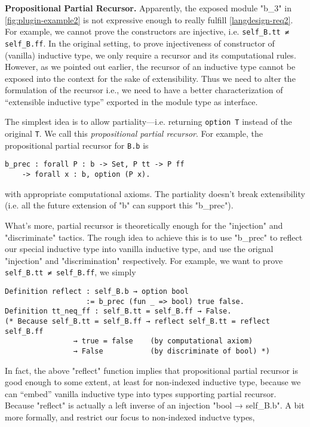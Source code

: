 \textbf{Propositional Partial Recursor.}
Apparently, the exposed module "b_3" in \cref{fig:plugin-example2} is not expressive enough to really fulfill \ref{langdesign-req2}. For example, we cannot prove the constructors are injective, i.e. \texttt{self_B.tt ≠ self_B.ff}. In the original setting, to prove injectiveness of constructor of (vanilla) inductive type, we only require a recursor and its computational rules. However, as we pointed out earlier, the recursor of an inductive type cannot be exposed into the context for the sake of extensibility. Thus we need to alter the formulation of the recursor i.e., we need to have a better characterization of ``extensible inductive type'' exported in the module type as interface.


The simplest idea is to allow partiality---i.e. returning \texttt{option T} instead of the original \texttt{T}. We call this \textit{propositional partial recursor}. For example, the propositional partial recursor for \texttt{B.b} is 
\begin{verbatim}
b_prec : forall P : b -> Set, P tt -> P ff 
    -> forall x : b, option (P x). 
\end{verbatim}
with appropriate computational axioms. The partiality doesn't break extensibility (i.e. all the future extension of "b" can support this "b_prec"). 

What's more, partial recursor is theoretically enough for the "injection" and "discriminate" tactics. The rough idea to achieve this is to use "b_prec" to reflect our special inductive type into vanilla inductive type, and use the orignal "injection" and "discrimination" respectively. For example, we want to prove \texttt{self_B.tt ≠ self_B.ff}, we simply 
\begin{verbatim}
Definition reflect : self_B.b → option bool 
                   := b_prec (fun _ => bool) true false.
Definition tt_neq_ff : self_B.tt = self_B.ff → False.
(* Because self_B.tt = self_B.ff → reflect self_B.tt = reflect self_B.ff 
                → true = false    (by computational axiom)
                → False           (by discriminate of bool) *)
\end{verbatim}



In fact, the above "reflect" function implies that propositional partial recursor is good enough to some extent, at least for non-indexed inductive type, because we can ``embed'' vanilla inductive type into types supporting partial recursor. Because "reflect" is actually a left inverse of an injection "bool → self_B.b". A bit more formally, and restrict our focus to non-indexed inductve types,

